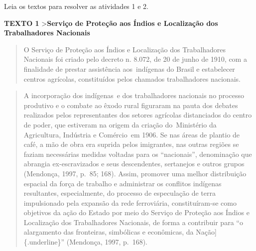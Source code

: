 
Leia os textos para resolver as atividades 1 e 2.

\textbf{TEXTO 1}
\textgreater{}\textbf{Serviço de Proteção aos Índios e Localização dos Trabalhadores Nacionais}

\begin{quote}
O Serviço de Proteção aos Índios e Localização dos Trabalhadores
Nacionais foi criado pelo decreto n. 8.072, de 20 de junho de 1910, com
a finalidade de prestar assistência aos~indígenas do Brasil e
estabelecer centros agrícolas, constituídos pelos chamados trabalhadores
nacionais.
\end{quote}

\begin{quote}
A incorporação dos indígenas~e dos trabalhadores nacionais no processo
produtivo e o combate ao êxodo rural figuraram na pauta dos debates
realizados pelos representantes dos setores agrícolas distanciados do
centro de poder, que estiveram na origem da criação do~Ministério da
Agricultura, Indústria e Comércio~em 1906. Se nas áreas de plantio de
café, a mão de obra era suprida pelos imigrantes, nas outras regiões se
faziam necessárias medidas voltadas para os ``nacionais'', denominação
que abrangia ex-escravizados e seus descendentes, sertanejos e outros
grupos (Mendonça, 1997, p.~85; 168). Assim, promover uma melhor
distribuição espacial da força de trabalho e administrar os conflitos
indígenas resultantes, especialmente, do processo de especulação de
terra impulsionado pela expansão da rede ferroviária, constituíram-se
como objetivos da ação do Estado por meio do Serviço de Proteção aos
Índios e Localização dos Trabalhadores Nacionais, de forma a contribuir
para ``o alargamento das fronteiras, simbólicas e econômicas, da
Nação{]}\{.underline\}'' (Mendonça, 1997, p.~168).
\end{quote}

